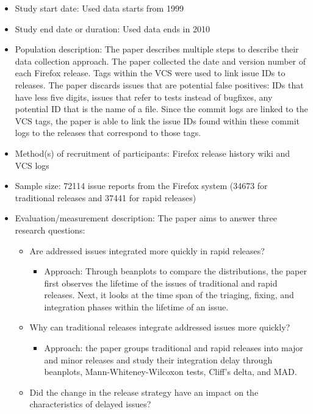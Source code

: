 \documentclass[]{book}
\providecommand{\tightlist}{%
  \setlength{\itemsep}{0pt}\setlength{\parskip}{0pt}}
\begin{document}
\begin{itemize}
\tightlist
\item
  Study start date: Used data starts from 1999
\item
  Study end date or duration: Used data ends in 2010
\item
  Population description: The paper describes multiple steps to describe
  their data collection approach. The paper collected the date and
  version number of each Firefox release. Tags within the VCS were used
  to link issue IDs to releases. The paper discards issues that are
  potential false positives: IDs that have less five digits, issues that
  refer to tests instead of bugfixes, any potential ID that is the name
  of a file. Since the commit logs are linked to the VCS tags, the paper
  is able to link the issue IDs found within these commit logs to the
  releases that correspond to those tags.
\item
  Method(s) of recruitment of participants: Firefox release history wiki
  and VCS logs
\item
  Sample size: 72114 issue reports from the Firefox system (34673 for
  traditional releases and 37441 for rapid releases)
\item
  Evaluation/measurement description: The paper aims to answer three
  research questions:

  \begin{itemize}
  \tightlist
  \item
    Are addressed issues integrated more quickly in rapid releases?

    \begin{itemize}
    \tightlist
    \item
      Approach: Through beanplots to compare the distributions, the
      paper first observes the lifetime of the issues of traditional and
      rapid releases. Next, it looks at the time span of the triaging,
      fixing, and integration phases within the lifetime of an issue.
    \end{itemize}
  \item
    Why can traditional releases integrate addressed issues more
    quickly?

    \begin{itemize}
    \tightlist
    \item
      Approach: the paper groups traditional and rapid releases into
      major and minor releases and study their integration delay through
      beanplots, Mann-Whiteney-Wilcoxon tests, Cliff's delta, and MAD.
    \end{itemize}
  \item
    Did the change in the release strategy have an impact on the
    characteristics of delayed issues?


\end{itemize}
\end{itemize}
\end{document}
